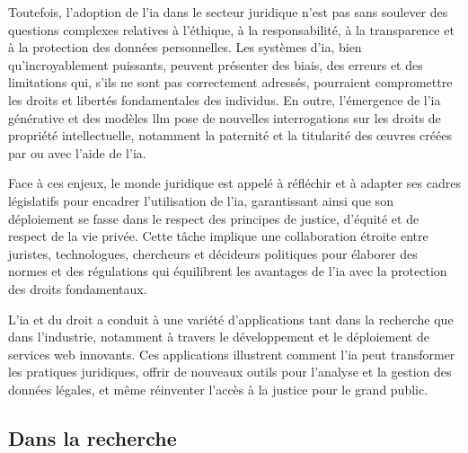 Toutefois, l'adoption de l'\ac{ia} dans le secteur juridique n'est pas sans soulever des questions complexes relatives à l'éthique, à la responsabilité, à la transparence et à la protection des données personnelles. Les systèmes d'\ac{ia}, bien qu'incroyablement puissants, peuvent présenter des biais, des erreurs et des limitations qui, s'ils ne sont pas correctement adressés, pourraient compromettre les droits et libertés fondamentales des individus. En outre, l'émergence de l'\ac{ia} générative et des modèles \ac{llm} pose de nouvelles interrogations sur les droits de propriété intellectuelle, notamment la paternité et la titularité des œuvres créées par ou avec l'aide de l'\ac{ia}.

Face à ces enjeux, le monde juridique est appelé à réfléchir et à adapter ses cadres législatifs pour encadrer l'utilisation de l'\ac{ia}, garantissant ainsi que son déploiement se fasse dans le respect des principes de justice, d'équité et de respect de la vie privée. Cette tâche implique une collaboration étroite entre juristes, technologues, chercheurs et décideurs politiques pour élaborer des normes et des régulations qui équilibrent les avantages de l'\ac{ia} avec la protection des droits fondamentaux.

L'\ac{ia} et du droit a conduit à une variété d'applications tant dans la recherche que dans l'industrie, notamment à travers le développement et le déploiement de services web innovants. Ces applications illustrent comment l'\ac{ia} peut transformer les pratiques juridiques, offrir de nouveaux outils pour l'analyse et la gestion des données légales, et même réinventer l'accès à la justice pour le grand public.

\newpage
\subsection{Dans la recherche}

